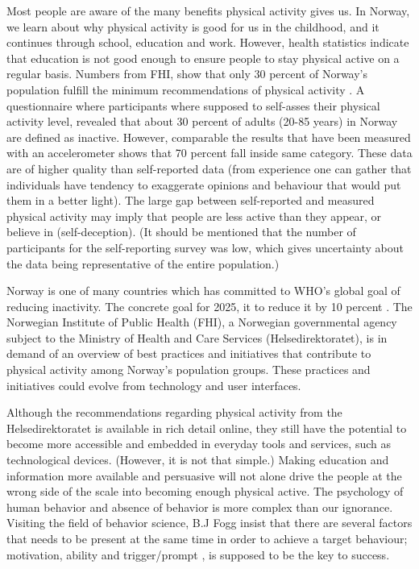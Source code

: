 Most people are aware of the many benefits physical activity gives us. In Norway, we learn about why physical activity is good for us in the childhood, and it continues through school, education and work. However, health statistics indicate that education is not good enough to ensure people to stay physical active on a regular basis. Numbers from FHI, show that only 30 percent of Norway's population fulfill the minimum recommendations of physical activity \cite{folkehelseinstituttet_fysisk_nodate}. %
A questionnaire where participants where supposed to self-asses their physical activity level, revealed that about 30 percent of adults (20-85 years) in Norway are defined as inactive. However, comparable the results that have been measured with an accelerometer shows that 70 percent fall inside same category. These data are of higher quality than self-reported data (from experience one can gather that individuals have tendency to exaggerate opinions and behaviour that would put them in a better light). The large gap between self-reported and measured physical activity may imply that people are less active than they appear, or believe in (self-deception). (It should be mentioned that the number of participants for the self-reporting survey was low, which gives uncertainty about the data being representative of the entire population.) 

Norway is one of many countries which has committed to WHO's global goal of reducing inactivity. The concrete goal for 2025, it to reduce it by 10 percent \cite{noauthor_inaktivitet_nodate}.
The Norwegian Institute of Public Health (FHI), a Norwegian governmental agency subject to the Ministry of Health and Care Services (Helsedirektoratet), is in demand of an overview of best practices and initiatives that contribute to physical activity among Norway's population groups. These practices and initiatives could evolve from technology and user interfaces.

Although the recommendations regarding physical activity from the Helsedirektoratet is available in rich detail online, they still have the potential to become more accessible and embedded in everyday tools and services, such as technological devices. (However, it is not that simple.) Making education and information more available and persuasive will not alone drive the people at the wrong side of the scale into becoming enough physical active. The psychology of human behavior and absence of behavior is more complex than our ignorance. Visiting the field of behavior science, B.J Fogg insist that there are several factors that needs to be present at the same time in order to achieve a target behaviour; motivation, ability and trigger/prompt \cite{fogg_persuasive_2003}, is supposed to be the key to success. 

